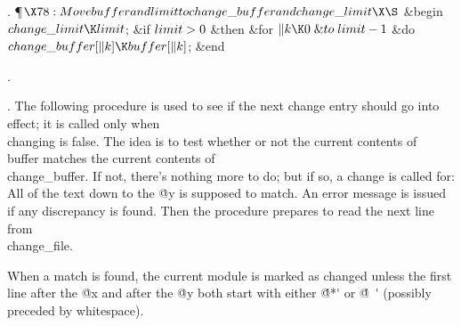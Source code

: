 . \P$\X78:Move \\{buffer} and \\{limit} to \\{change\_buffer} and \\{change%
\_limit}\X\S$\6
\&{begin} $\\{change\_limit}\K\\{limit}$;\6
\&{if} $\\{limit}>0$ \1\&{then}\6
\&{for} $\|k\K0\mathrel{\&{to}}\\{limit}-1$ \1\&{do}\5
$\\{change\_buffer}[\|k]\K\\{buffer}[\|k]$;\2\2\6
\&{end}\par
{}.\fi

. The following procedure is used to see if the next change entry should
go into effect; it is called only when \\{changing} is false.
The idea is to test whether or not the current
contents of \\{buffer} matches the current contents of \\{change\_buffer}.
If not, there's nothing more to do; but if so, a change is called for:
All of the text down to the \.{@y} is supposed to match. An error
message is issued if any discrepancy is found. Then the procedure
prepares to read the next line from \\{change\_file}.

When a match is found, the current module is marked as changed unless
the first line after the \.{@x} and after the \.{@y} both start with
either \.{\'@*\'} or \.{\'@\ \'} (possibly preceded by whitespace).

